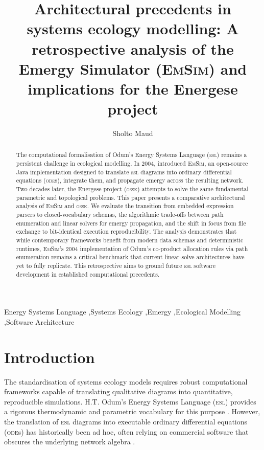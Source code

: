 \documentclass[3p,times,authoryear]{elsarticle}
\newcommand{\gssk}{\textsc{gssk}}
\newcommand{\esl}{\textsc{esl}}
\newcommand{\emsim}{\textsc{EmSim}}
\begin{document}
\begin{frontmatter}

\title{Architectural precedents in systems ecology modelling: A retrospective analysis of the Emergy Simulator (\emsim) and implications for the Energese project}

\author{Sholto Maud}

\begin{abstract}
The computational formalisation of Odum's Energy Systems Language (\esl) remains a persistent challenge in ecological modelling. In 2004, \citet{valyi2004} introduced \emsim, an open-source Java implementation designed to translate \esl{} diagrams into ordinary differential equations (\textsc{ode}s), integrate them, and propagate emergy across the resulting network. Two decades later, the Energese project (\gssk) attempts to solve the same fundamental parametric and topological problems. This paper presents a comparative architectural analysis of \emsim{} and \gssk. We evaluate the transition from embedded expression parsers to closed-vocabulary schemas, the algorithmic trade-offs between path enumeration and linear solvers for emergy propagation, and the shift in focus from file exchange to bit-identical execution reproducibility. The analysis demonstrates that while contemporary frameworks benefit from modern data schemas and deterministic runtimes, \emsim's 2004 implementation of Odum's co-product allocation rules via path enumeration remains a critical benchmark that current linear-solve architectures have yet to fully replicate. This retrospective aims to ground future \esl{} software development in established computational precedents.
\end{abstract}

\begin{keyword}
Energy Systems Language \sep Systems Ecology \sep Emergy \sep Ecological Modelling \sep Software Architecture
\end{keyword}

\end{frontmatter}

\section{Introduction}
\label{sec:intro}

The standardisation of systems ecology models requires robust computational frameworks capable of translating qualitative diagrams into quantitative, reproducible simulations. H.T. Odum's Energy Systems Language (\esl) provides a rigorous thermodynamic and parametric vocabulary for this purpose \citep{odum1994,odum1996}. However, the translation of \esl{} diagrams into executable ordinary differential equations (\textsc{ode}s) has historically been ad hoc, often relying on commercial software that obscures the underlying network algebra \citep{valyi2004}.
\end{document}
